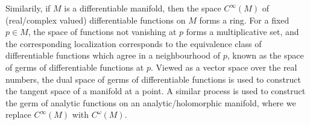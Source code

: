 \begin{example}
    Similarily, if $M$ is a differentiable manifold, then the space $C^\infty(M)$ of (real/complex valued) differentiable functions on $M$ forms a ring. For a fixed $p \in M$, the space of functions not vanishing at $p$ forms a multiplicative set, and the corresponding localization corresponds to the equivalence class of differentiable functions which agree in a neighbourhood of $p$, known as the space of germs of differentiable functions at $p$. Viewed as a vector space over the real numbers, the dual space of germs of differentiable functions is used to construct the tangent space of a manifold at a point. A similar process is used to construct the germ of analytic functions on an analytic/holomorphic manifold, where we replace $C^\infty(M)$ with $C^\omega(M)$.
\end{example}



